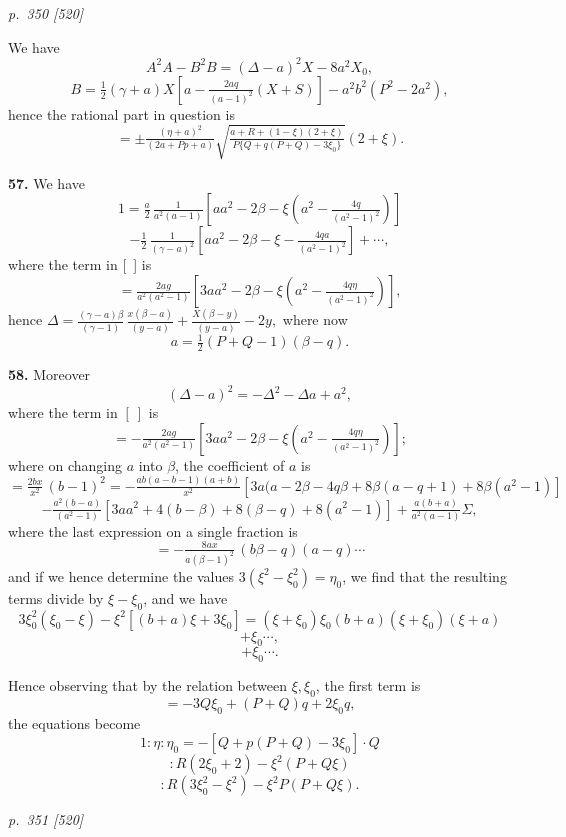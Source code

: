 \documentclass[11pt,a4paper]{book}
\begin{document}
\clearpage

\bigskip
\textit{p.~350 [520]}
\smallskip

We have
\[
A^2A - B^2B = (\Delta - a)^2 X - 8a^2 X_0,
\]
\[
B = \tfrac{1}{2}(\gamma + a)X\!\left[a - \tfrac{2aq}{(a - 1)^2}(X + S)\right] - a^2 b^2(P^2 - 2a^2),
\]
hence the rational part in question is
\[
= \pm \tfrac{(\eta + a)^2}{(2a + Pp + a)}\sqrt{\tfrac{a + R + (1 - \xi)(2 + \xi)}{P\{Q + q(P + Q) - 3\xi_0\}}}(2 + \xi).
\]

\textbf{57.} We have
\[
1 = \tfrac{a}{2}\,\tfrac{1}{a^2(a - 1)}\!\left[a a^2 - 2\beta - \xi\!\left(a^2 - \tfrac{4q}{(a^2 - 1)^2}\right)\right]
\]
\[
- \tfrac{1}{2}\,\tfrac{1}{(\gamma - a)^2}\!\left[a a^2 - 2\beta - \xi - \tfrac{4qa}{(a^2 - 1)^2}\right] + \cdots,
\]
where the term in [\ ] is
\[
= \tfrac{2ag}{a^2(a^2 - 1)}\!\left[3a a^2 - 2\beta - \xi\!\left(a^2 - \tfrac{4q\eta}{(a^2 - 1)^2}\right)\right],
\]
hence $\Delta = \tfrac{(\gamma - a)\beta}{(\gamma - 1)}\,\tfrac{x(\beta - a)}{(y - a)} + \tfrac{X(\beta - y)}{(y - a)} - 2y,$
where now
\[
a = \tfrac{1}{2}(P + Q - 1)(\beta - q).
\]

\textbf{58.} Moreover
\[
(\Delta - a)^2 = -\Delta^2 - \Delta a + a^2,
\]
where the term in $[\ ]$ is
\[
= -\tfrac{2ag}{a^2(a^2 - 1)}\!\left[3a a^2 - 2\beta - \xi\!\left(a^2 - \tfrac{4q\eta}{(a^2 - 1)^2}\right)\right];
\]
where on changing $a$ into $\beta$, the coefficient of $a$ is
\[
= \tfrac{2bx}{x^2}\,(b - 1)^2 = -\tfrac{ab(a - b - 1)(a + b)}{x^2}\!\left[3a(a - 2\beta - 4q\beta + 8\beta(a - q + 1) + 8\beta(a^2 - 1)\right]
\]
\[
- \tfrac{a^2(b - a)}{(a^2 - 1)}\!\left[3a a^2 + 4(b - \beta) + 8(\beta - q) + 8(a^2 - 1)\right] + \tfrac{a(b + a)}{a^2(a - 1)}\Sigma,
\]
where the last expression on a single fraction is
\[
= -\tfrac{8ax}{a(\beta - 1)^2}\,(b\beta - q)(a - q)\cdots
\]
and if we hence determine the values $3(\xi^2 - \xi_0^2) = \eta_0$, we find that the resulting terms divide by $\xi - \xi_0$, and we have
\[
3\xi_0^2(\xi_0 - \xi) - \xi^2[(b + a)\xi + 3\xi_0] = (\xi + \xi_0)\xi_0(b + a)(\xi + \xi_0)(\xi + a)
\]
\[
+ \xi_0 \cdots,
\]
\[
+ \xi_0 \cdots.
\]

Hence observing that by the relation between $\xi, \xi_0$, the first term is
\[
= -3Q\xi_0 + (P + Q)q + 2\xi_0 q,
\]
the equations become
\[
1: \eta : \eta_0 = -[Q + p(P + Q) - 3\xi_0] \cdot Q
\]
\[
: R(2\xi_0 + 2) - \xi^2(P + Q\xi)
\]
\[
: R(3\xi_0^2 - \xi^2) - \xi^2 P(P + Q\xi).
\]

\clearpage

\bigskip
\textit{p.~351 [520]}
\smallskip
\end{document}
